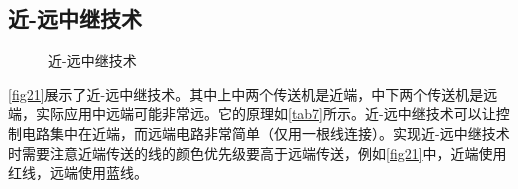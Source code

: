 \subsection{近-远中继技术}\label{sec16}
\begin{figure}[!ht]
\centering
{}
\qquad
{}
\caption{近-远中继技术}
\end{figure}
\autoref{fig21}展示了近-远中继技术。其中上中两个传送机是近端，中下两个传送机是远端，实际应用中远端可能非常远。它的原理如\autoref{tab7}所示。近-远中继技术可以让控制电路集中在近端，而远端电路非常简单（仅用一根线连接）。实现近-远中继技术时需要注意近端传送的线的颜色优先级要高于远端传送，例如\autoref{fig21}中，近端使用红线，远端使用蓝线。

